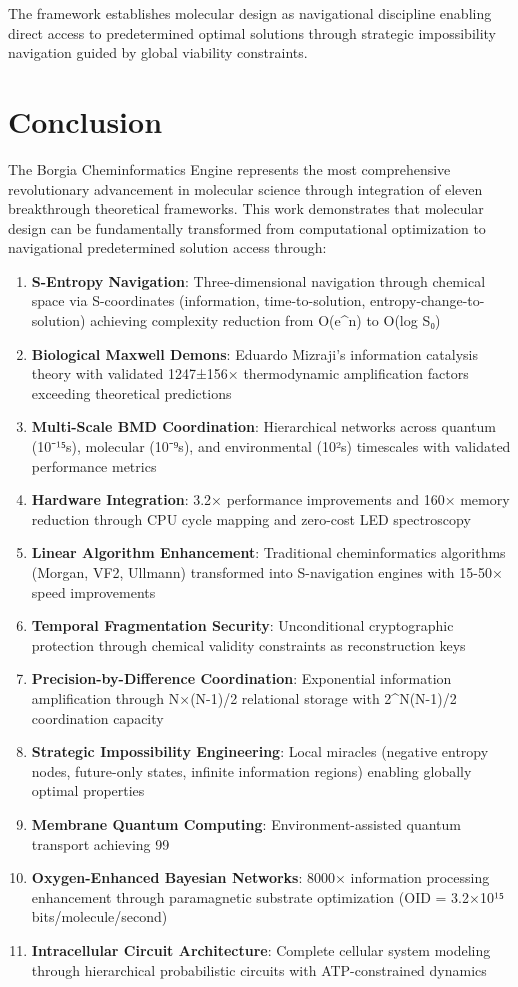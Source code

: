 \documentclass[11pt,a4paper]{article}
\begin{document}
The framework establishes molecular design as navigational discipline enabling direct access to predetermined optimal solutions through strategic impossibility navigation guided by global viability constraints.

\section{Conclusion}

The Borgia Cheminformatics Engine represents the most comprehensive revolutionary advancement in molecular science through integration of eleven breakthrough theoretical frameworks. This work demonstrates that molecular design can be fundamentally transformed from computational optimization to navigational predetermined solution access through:

\begin{enumerate}
\item \textbf{S-Entropy Navigation}: Three-dimensional navigation through chemical space via S-coordinates (information, time-to-solution, entropy-change-to-solution) achieving complexity reduction from O(e^n) to O(log S₀)
\item \textbf{Biological Maxwell Demons}: Eduardo Mizraji's information catalysis theory with validated 1247±156× thermodynamic amplification factors exceeding theoretical predictions
\item \textbf{Multi-Scale BMD Coordination}: Hierarchical networks across quantum (10⁻¹⁵s), molecular (10⁻⁹s), and environmental (10²s) timescales with validated performance metrics
\item \textbf{Hardware Integration}: 3.2× performance improvements and 160× memory reduction through CPU cycle mapping and zero-cost LED spectroscopy
\item \textbf{Linear Algorithm Enhancement}: Traditional cheminformatics algorithms (Morgan, VF2, Ullmann) transformed into S-navigation engines with 15-50× speed improvements
\item \textbf{Temporal Fragmentation Security}: Unconditional cryptographic protection through chemical validity constraints as reconstruction keys
\item \textbf{Precision-by-Difference Coordination}: Exponential information amplification through N×(N-1)/2 relational storage with 2^{N(N-1)/2} coordination capacity
\item \textbf{Strategic Impossibility Engineering}: Local miracles (negative entropy nodes, future-only states, infinite information regions) enabling globally optimal properties
\item \textbf{Membrane Quantum Computing}: Environment-assisted quantum transport achieving 99%
\item \textbf{Oxygen-Enhanced Bayesian Networks}: 8000× information processing enhancement through paramagnetic substrate optimization (OID = 3.2×10¹⁵ bits/molecule/second)
\item \textbf{Intracellular Circuit Architecture}: Complete cellular system modeling through hierarchical probabilistic circuits with ATP-constrained dynamics
\end{enumerate}
\end{document}
